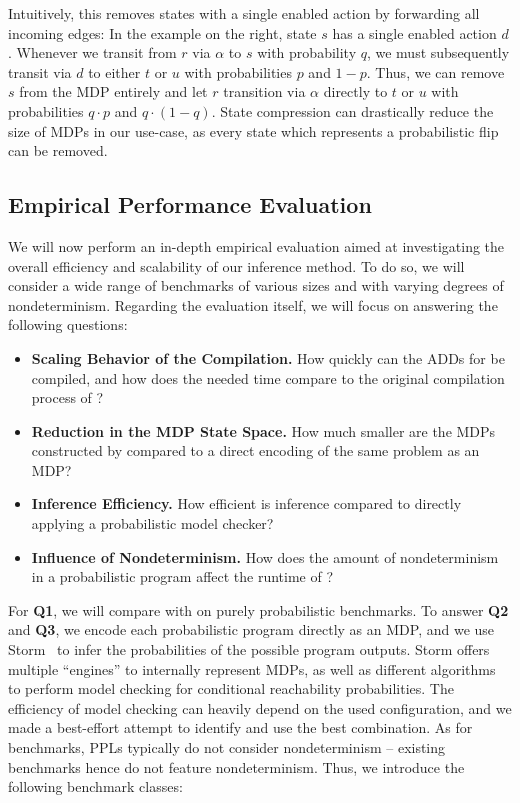 Intuitively, this removes states with a single enabled action by forwarding all incoming edges:
In the example on the right, state $s$ has a single enabled action $d$. 
Whenever we transit from $r$ via $\alpha$ to $s$ with probability $q$, we must subsequently transit via $d$ to either $t$ or $u$ with probabilities $p$  and $1-p$. 
Thus, we can remove $s$ from the MDP entirely and let $r$ transition via $\alpha$ directly to $t$ or $u$ with probabilities $q \cdot p$ and $q \cdot (1-q)$.
State compression can drastically reduce the size of MDPs in our use-case, as every state which represents a probabilistic flip can be removed.



\subsection{Empirical Performance Evaluation}\label{sec:ndet_empirical}
We will now perform an in-depth empirical evaluation aimed at investigating the overall efficiency and scalability of our inference method. 
To do so, we will consider a wide range of benchmarks of various sizes and with varying degrees of nondeterminism.
Regarding the evaluation itself, we will focus on answering the following questions:
\begin{itemize}
	\item[\textbf{Q1}:] \textbf{Scaling Behavior of the Compilation.}
	How quickly can the ADDs for \NDICE be compiled, and how does the needed time compare to the original compilation process of \DICE?
	\item[\textbf{Q2}:] \textbf{Reduction in the MDP State Space.}
	How much smaller are the MDPs constructed by \NDICE compared to a direct encoding of the same problem as an MDP? 
	\item[\textbf{Q3}:] \textbf{Inference Efficiency.} 
	How efficient is \NDICE inference compared to directly applying a probabilistic model checker?
	\item[\textbf{Q4}:] \textbf{Influence of Nondeterminism.}
	How does the amount of nondeterminism in a probabilistic program affect the runtime of \NDICE?
\end{itemize}
\noindent
For \textbf{Q1}, we will compare \NDICE with \DICE on purely probabilistic benchmarks.
To answer \textbf{Q2} and \textbf{Q3}, we encode each probabilistic program directly as an MDP, and we use Storm~\cite{hensel2022probabilistic} to infer the probabilities of the possible program outputs.
Storm offers multiple \enquote{engines} to internally represent MDPs, as well as different algorithms to perform model checking for conditional reachability probabilities.
The efficiency of model checking can heavily depend on the used configuration, and we made a best-effort attempt to identify and use the best combination.
As for benchmarks, PPLs typically do not consider nondeterminism -- existing benchmarks hence do not feature nondeterminism.
Thus, we introduce the following benchmark classes:



